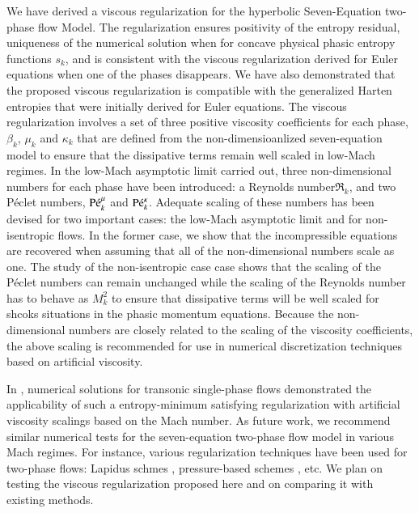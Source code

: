 \documentclass[preprint,10pt]{elsarticle}
\begin{document}
We have derived a viscous regularization for the hyperbolic Seven-Equation two-phase flow Model. The regularization ensures positivity of the entropy residual, uniqueness of the numerical solution when for concave physical phasic entropy functions $s_k$, and is consistent with the viscous regularization derived for Euler equations when one of the phases disappears. 
We have also demonstrated that the proposed viscous regularization is compatible with the generalized Harten entropies that were initially derived for Euler equations. The viscous regularization involves a set of three positive viscosity coefficients for each phase, $\beta_k$, $\mu_k$ and $\kappa_k$ that are defined from the non-dimensioanlized seven-equation model to ensure that the dissipative terms remain well scaled in
low-Mach regimes. In the low-Mach asymptotic limit carried out, three non-dimensional numbers for each phase have been introduced: a Reynolds number$\Re_k$, and two P\'eclet numbers, $\textrm{P\'e}_k^\mu$ and $\textrm{P\'e}_k^\kappa$. Adequate scaling of these numbers has been devised for two important cases: the low-Mach asymptotic limit and for non-isentropic flows. In the former case, we show that the incompressible equations are recovered when assuming that all of the non-dimensional numbers scale as one. The study of the non-isentropic case case shows that the scaling of the P\'eclet numbers can remain unchanged while the scaling of the Reynolds number has to behave as $M_k^2$ to ensure that dissipative terms will be well scaled for shcoks situations in the phasic momentum equations. Because the non-dimensional numbers are closely related to the scaling of the viscosity coefficients, the above scaling is recommended for use in numerical discretization techniques based on artificial viscosity. 

In \cite{Marco_paper_low_mach}, numerical solutions for transonic single-phase flows demonstrated the applicability of such a entropy-minimum satisfying regularization with artificial viscosity scalings based on the Mach number. As future work, we recommend similar numerical tests for the seven-equation two-phase flow model in various Mach regimes. For instance, various regularization techniques have been used for two-phase flows: Lapidus schmes \cite{Lapidus_paper, Lapidus_book}, pressure-based schemes \cite{PBV_book}, etc.  We plan on testing the viscous regularization proposed here and on comparing it with existing methods. 
\end{document}
